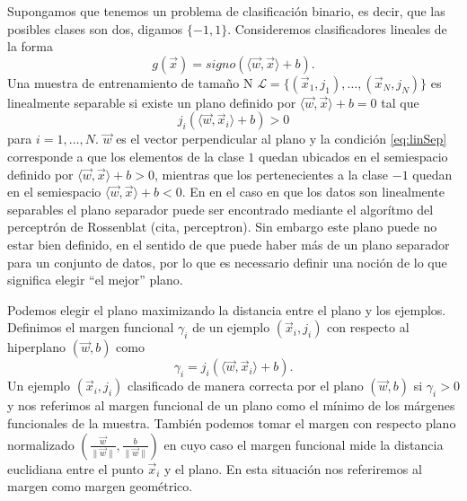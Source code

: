 \documentclass[letterpaper,12pt]{book}
\begin{document}
Supongamos que tenemos un problema de clasificación binario, es decir, que las posibles clases son dos, digamos $\{-1,1\}$. Consideremos clasificadores lineales de la forma
\begin{equation}\label{eq:clasificadorLineal}
g(\vec{x}) = signo( \langle \vec{w}, \vec{x} \rangle + b).
\end{equation}
 Una muestra de entrenamiento de tamaño N  $\mathcal{L} = \{(\vec{x}_1, j_1), \dots, (\vec{x}_N, j_N)\}$ es linealmente separable si existe un plano definido por $\langle \vec{w}, \vec{x} \rangle +b =0$ tal que
\begin{equation}\label{eq:linSep}
j_{i}\left(\langle \vec{w}, \vec{x}_i \rangle +b\right)> 0
\end{equation}
para $i = 1,\dots, N$. $\vec{w}$ es el vector perpendicular al plano y la condición \ref{eq:linSep} corresponde a que los elementos de la clase $1$ quedan ubicados en el semiespacio definido por $\langle \vec{w}, \vec{x} \rangle +b > 0$, mientras que los pertenecientes a la clase $-1$ quedan en el semiespacio $\langle \vec{w}, \vec{x} \rangle + b< 0$. En en el caso en que los datos son linealmente separables el plano separador puede ser encontrado mediante el algorítmo del perceptrón de Rossenblat (cita, perceptron). Sin embargo este plano puede no estar bien definido, en el sentido de que puede haber más de un plano separador para un conjunto de datos, por lo que es necessario definir una noción de lo que significa elegir ``el mejor'' plano.

Podemos elegir el plano maximizando la distancia entre el plano y los ejemplos. Definimos el margen funcional $\gamma_i$ de un ejemplo $(\vec{x}_i, j_i)$ con respecto al hiperplano $(\vec{w}, b)$ como
\begin{equation}
\gamma_i = j_i(\langle\vec{w}, \vec{x}_i \rangle + b).
\end{equation}
Un ejemplo $(\vec{x}_i, j_i)$ clasificado de manera correcta por el plano $(\vec{w}, b)$ si $\gamma_i>0$ y nos referimos al margen funcional de un plano como el mínimo de los márgenes funcionales de la muestra. También podemos tomar el margen con respecto plano normalizado $(\frac{\vec{w}}{\|\vec{w}\|},\frac{b}{\|\vec{w}\|})$ en cuyo caso el margen funcional mide la distancia euclidiana entre el punto $\vec{x}_i$ y el plano. En esta situación nos referiremos al margen como  margen geométrico. 
\end{document}
